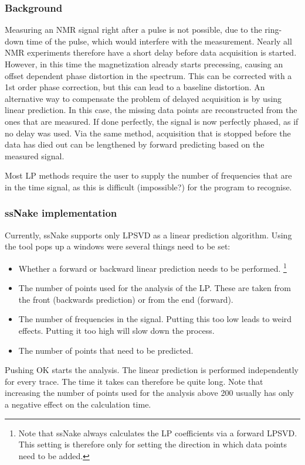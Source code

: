 \documentclass[11pt,a4paper]{article}
\begin{document}
\subsubsection*{Background}
Measuring an NMR signal right after a pulse is not possible, due to the ring-down time of the pulse, which would interfere with the measurement. Nearly all NMR experiments therefore have a short delay before data acquisition is started. However, in this time the magnetization already starts precessing, causing an offset dependent phase distortion in the spectrum. This can be corrected with a 1st order phase correction, but this can lead to a baseline distortion. An alternative way to compensate the problem of delayed acquisition is by using linear prediction. In this case, the missing data points are reconstructed from the ones that are measured. If done perfectly, the  signal is now perfectly phased, as if no delay was used. Via the same method, acquisition that is stopped before the data has died out can be lengthened by forward predicting based on the measured signal.

Most LP methods require the user to supply the number of frequencies that are in the time signal, as this is difficult (impossible?) for the program to recognise.

\subsubsection*{ssNake implementation}
Currently, ssNake supports only LPSVD as a linear prediction algorithm. Using the tool pops up a windows were several things need to be set:
\begin{itemize}
\item Whether a forward or backward linear prediction needs to be performed. \footnote{Note that ssNake always calculates the LP coefficients via a forward LPSVD. This setting is therefore only for setting the direction in which data points need to be added.}
\item The number of points used for the analysis of the LP. These are taken from the front (backwards prediction) or from the end (forward).
\item The number of frequencies in the signal. Putting this too low leads to weird effects. Putting it too high will slow down the process.
\item The number of points that need to be predicted.
\end{itemize}
Pushing OK starts the analysis. The linear prediction is performed independently for every trace. The time it takes can therefore be quite long. Note that increasing the number of points used for the analysis above 200 usually has only a negative effect on the calculation time.
\end{document}
